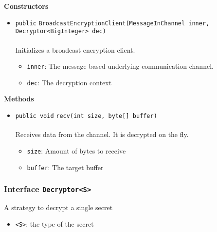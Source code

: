 \textbf{\sffamily Constructors}
\begin{itemize}
\item \lstinline|public| \lstinline|BroadcastEncryptionClient|\lstinline|(MessageInChannel inner, Decryptor<BigInteger> dec)|\\ \\[-0.6em]
Initializes a broadcast encryption client.
\begin{itemize}
\item \lstinline|inner|: The message-based underlying communication channel.
\item \lstinline|dec|: The decryption context
\end{itemize}



\end{itemize}


\textbf{\sffamily Methods}
\begin{itemize}
\item \lstinline|public void| \lstinline|recv|\lstinline|(int size, byte[] buffer)|\\ \\[-0.6em]
Receives data from the channel. It is decrypted on the fly.
\begin{itemize}
\item \lstinline|size|: Amount of bytes to receive
\item \lstinline|buffer|: The target buffer
\end{itemize}



\end{itemize}

\subsubsection{Interface \lstinline|Decryptor<S>|}
A strategy to decrypt a single secret \\
\noindent\begin{minipage}[t]{5cm}
\vspace{0.3em}
\hspace*{2em}
\vspace{0.3em}
\end{minipage}

\begin{itemize}
\item \lstinline|<S>|: the type of the secret
\end{itemize}




